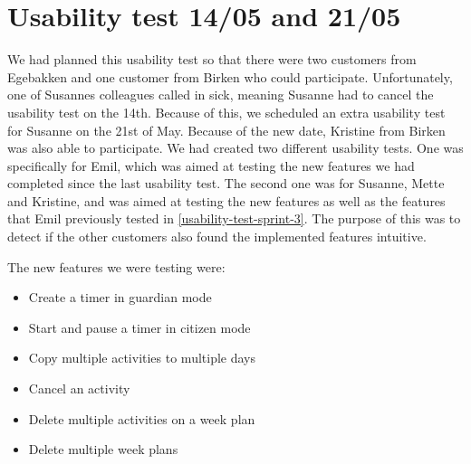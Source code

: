 \section{Usability test 14/05 and 21/05}\label{usability-test-14-05}
We had planned this usability test so that there were two customers from Egebakken and one customer from Birken who could participate.
Unfortunately, one of Susannes colleagues called in sick, meaning Susanne had to cancel the usability test on the 14th.
Because of this, we scheduled an extra usability test for Susanne on the 21st of May. 
Because of the new date, Kristine from Birken was also able to participate. 
We had created two different usability tests. 
One was specifically for Emil, which was aimed at testing the new features we had completed since the last usability test.
The second one was for Susanne, Mette and Kristine, and was aimed at testing the new features as well as the features that Emil previously tested in \autoref{usability-test-sprint-3}. 
The purpose of this was to detect if the other customers also found the implemented features intuitive.

The new features we were testing were:

\begin{itemize}
  \item Create a timer in guardian mode
  \item Start and pause a timer in citizen mode
  \item Copy multiple activities to multiple days
  \item Cancel an activity
  \item Delete multiple activities on a week plan
  \item Delete multiple week plans
\end{itemize}


